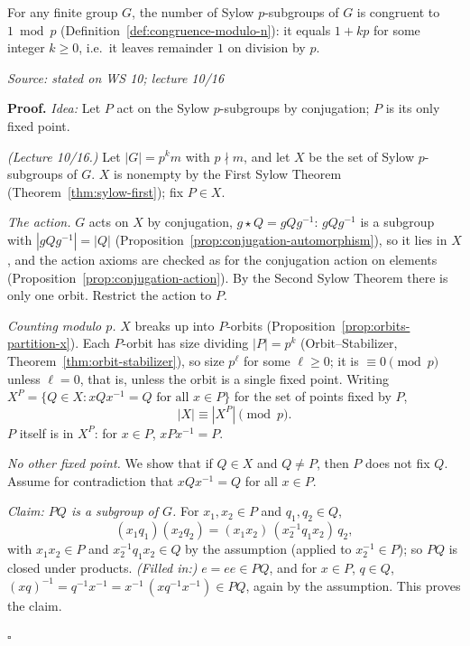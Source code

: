 \documentclass[11pt]{report}
\renewenvironment{proof}[1][Proof]{\noindent\textbf{#1.} }{\hfill$\square$\par\vspace{5pt}}
\newcommand{\srcline}[1]{\par\hfill{\footnotesize\textit{Source: #1}}}
\begin{document}
\begin{thmbox}\label{thm:sylow-third}
For any finite group $G$, the number of Sylow $p$-subgroups of $G$ is congruent to $1 \bmod p$ (Definition~\ref{def:congruence-modulo-n}): it equals $1 + kp$ for some integer $k \ge 0$, i.e.\ it leaves remainder $1$ on division by $p$.
\srcline{stated on WS 10; lecture 10/16}
\end{thmbox}

\begin{proof}
\textit{Idea:} Let $P$ act on the Sylow $p$-subgroups by conjugation; $P$ is its only fixed point.\par
\textit{(Lecture 10/16.)} Let $|G| = p^k m$ with $p \nmid m$, and let $X$ be the set of Sylow $p$-subgroups of $G$. $X$ is nonempty by the First Sylow Theorem (Theorem~\ref{thm:sylow-first}); fix $P \in X$.

\emph{The action.} $G$ acts on $X$ by conjugation, $g \star Q = gQg^{-1}$: $gQg^{-1}$ is a subgroup with $|gQg^{-1}| = |Q|$ (Proposition~\ref{prop:conjugation-automorphism}), so it lies in $X$, and the action axioms are checked as for the conjugation action on elements (Proposition~\ref{prop:conjugation-action}). By the Second Sylow Theorem there is only one orbit. Restrict the action to $P$.

\emph{Counting modulo $p$.} $X$ breaks up into $P$-orbits (Proposition~\ref{prop:orbits-partition-x}). Each $P$-orbit has size dividing $|P| = p^k$ (Orbit--Stabilizer, Theorem~\ref{thm:orbit-stabilizer}), so size $p^\ell$ for some $\ell \geq 0$; it is $\equiv 0 \pmod p$ unless $\ell = 0$, that is, unless the orbit is a single fixed point. Writing $X^P = \{Q \in X : xQx^{-1} = Q \text{ for all } x \in P\}$ for the set of points fixed by $P$,
\[ |X| \equiv |X^P| \pmod p. \]
$P$ itself is in $X^P$: for $x \in P$, $xPx^{-1} = P$.

\emph{No other fixed point.} We show that if $Q \in X$ and $Q \neq P$, then $P$ does not fix $Q$. Assume for contradiction that $xQx^{-1} = Q$ for all $x \in P$.

\emph{Claim: $PQ$ is a subgroup of $G$.} For $x_1, x_2 \in P$ and $q_1, q_2 \in Q$,
\[ (x_1q_1)(x_2q_2) = (x_1x_2)\,(x_2^{-1}q_1x_2)\,q_2 , \]
with $x_1x_2 \in P$ and $x_2^{-1}q_1x_2 \in Q$ by the assumption (applied to $x_2^{-1} \in P$); so $PQ$ is closed under products. \textit{(Filled in:)} $e = ee \in PQ$, and for $x \in P$, $q \in Q$, $(xq)^{-1} = q^{-1}x^{-1} = x^{-1}\,(xq^{-1}x^{-1}) \in PQ$, again by the assumption. This proves the claim.


\end{proof}
\end{document}
